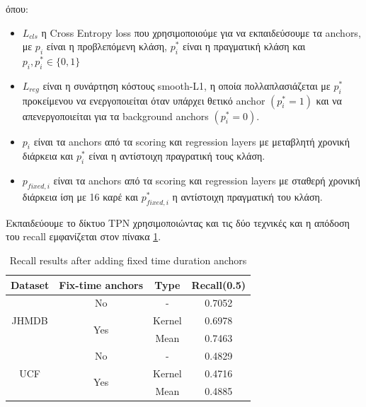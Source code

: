 όπου:
\begin{itemize}
\item\en $L_{cls} $  η \en Cross Entropy loss \gr που χρησιμοποιούμε για να εκπαιδεύσουμε τα \en anchors\gr, με \en $p_i$ \gr είναι η προβλεπόμενη κλάση, \en $p_i^*$ \gr είναι
  η πραγματική κλάση και   \en $p_i, p_i^* \in \{0,1\}$
\item\en $L_{reg} $ \gr είναι η συνάρτηση κόστους \en smooth-L1\gr, η οποία πολλαπλασιάζεται με \en $p_i^*$ \gr προκείμενου να ενεργοποιείται όταν υπάρχει θετικό \en anchor $(p_i^* = 1)$ \gr
  και να απενεργοποιείται για τα \en background anchors $(p_i^* = 0)$.
\item\en $p_i $ \gr είναι τα \en anchors \gr από τα \en scoring \gr και \en regression layers \gr με μεταβλητή χρονική διάρκεια και  \en $p_i^*$ \gr είναι η αντίστοιχη πραγρατική τους κλάση.
\item\en $p_{fixed,i} $ \gr είναι τα \en anchors \gr από τα \en scoring \gr και \en regression layers \gr με σταθερή χρονική διάρκεια ίση με 16 καρέ και \en $p_{fixed,i}^*$   η
  αντίστοιχη πραγματική του κλάση.

\end{itemize}

Εκπαιδεύουμε το δίκτυο \en TPN \gr χρησιμοποιώντας και τις δύο τεχνικές και η  απόδοση του \en recall \gr εμφανίζεται στον πίνακα  \ref{table:gr_add_16}.

\en
\begin{table}[h]
  \centering
  \begin{tabular}{||c | c | c || c ||}
    \hline
    \textbf{Dataset} & \textbf{Fix-time anchors} & \textbf{Type} & \textbf{Recall(0.5)} \\
    \hline  \hline
    \multirow{3}{4em}{JHMDB} & No &  - & 0.7052 \\
    \cline{2-4}
    {} & \multirow{2}{*}{Yes} & Kernel & 0.6978 \\
    \cline{3-4}
    {} & {} & Mean & 0.7463 \\
    \hline
    \multirow{3}{4em}{UCF} & No & - & 0.4829 \\
    \cline{2-4}
    {} & \multirow{2}{*}{Yes} & Kernel & 0.4716 \\
    \cline{3-4}
    {} & {} & Mean & 0.4885 \\
    \hline      
  \end{tabular}
  \caption{\en Recall results after adding fixed time duration anchors}
  \label{table:gr_add_16}
\end{table}
\gr

